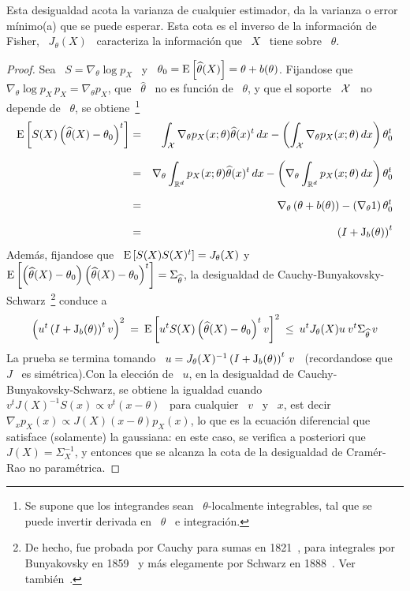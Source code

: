 %
\noindent Esta desigualdad  acota la varianza de cualquier  estimador, \ie da la
varianza o error m\'inimo(a) que se puede esperar. Esta cota es el inverso de la
informaci\'on de Fisher, \ie \  $J_\theta(X)$ \ caracteriza la informaci\'on que
\ $X$ \ tiene sobre \ $\theta$.
%
\begin{proof}
  Sea  \   $S  =  \nabla_\theta  \log   p_X$  \  y  \   $\theta_0  =  \operatorname{E}\left[
    \widehat{\theta}(X)  \right]   =  \theta  +  b(\theta)$.   Fijandose  que  \
  $\nabla_\theta \log p_X \, p_X  = \nabla_\theta p_X$, que \ $\widehat{\theta}$
  \ no  es funci\'on de \ $\theta$,  y que el soporte  \ $\mathcal{X}$ \ no  depende de \
  $\theta$,  se   obtiene~\footnote{Se  supone   que  los  integrandes   sean  \
    $\theta$-localmente  integrables, tal que  se puede  invertir derivada  en \
    $\theta$ \ e integraci\'on.}
  \begin{eqnarray*}
  \operatorname{E}\left[ S(X) \left( \widehat{\theta}(X) - \theta_0 \right)^t \right] & = &
  \int_{\mathcal{X}} \nabla_\theta p_X(x;\theta) \widehat{\theta}(x)^t \, dx - \left(
  \int_{\mathcal{X}} \nabla_\theta p_X(x;\theta) \, dx \right) \theta_0^t\\[2.5mm]
  & = & \nabla_\theta \int_{\mathbb{R}^d} p_X(x;\theta) \widehat{\theta}(x)^t \, dx -
  \left( \nabla_\theta \int_{\mathbb{R}^d} p_X(x;\theta) \, dx \right)
  \theta_0^t\\[2.5mm]
  & = & \nabla_\theta \left( \theta + b(\theta) \right)  - 
  \left( \nabla_\theta 1 \right) \theta_0^t\\[2.5mm]
  & = & \left( I + \operatorname{J}_b(\theta) \right)^t
  \end{eqnarray*}
  Adem\'as, fijandose  que \  $\operatorname{E}\left[ S(X) S(X)^t  \right] =  J_\theta(X)$ y
  $\operatorname{E}\left[   \left(    \widehat{\theta}(X)   -   \theta_0    \right)   \left(
      \widehat{\theta}(X)      -      \theta_0      \right)^t     \right]      =
  \Sigma_{\widehat{\theta}}$,            la            desigualdad            de
  Cauchy-Bunyakovsky-Schwarz~\footnote{De  hecho, fue  probada  por Cauchy  para
    sumas   en   1821~\cite{Cau21},   para   integrales   por   Bunyakovsky   en
    1859~\cite{Bou59} y  m\'as elegamente por Schwarz  en 1888~\cite{Sch88}. Ver
    tambi\'en~\cite{Ste04}.}  conduce a
  \[
  \left( u^t \left( I + \operatorname{J}_b(\theta)  \right)^t v \right)^2 \: = \: \operatorname{E}\left[
    u^t S(X) \left( \widehat{\theta}(X) -  \theta_0 \right)^t v \right]^2 \: \le
  \: u^t J_\theta(X) u \: v^t \Sigma_{\widehat{\theta}} \, v
  \]
  La prueba se termina tomando \ $u = J_\theta(X)^{-1} \left( I + \operatorname{J}_b(\theta)
  \right)^t \,  v$ \ (recordandose que  \ $J$ \ es  sim\'etrica).\newline Con la
  elecci\'on  de \  $u$,  en la  desigualdad  de Cauchy-Bunyakovsky-Schwarz,  se
  obtiene la igualdad  cuando \ $v^t J(X)^{-1} S(x) \propto v^t  (x - \theta)$ \
  para cualquier \ $v$ \ y \ $x$,  est decir \ $\nabla_x p_X (x) \propto J(X) (x
  -  \theta)  p_X(x)$,  lo  que  es  la  ecuaci\'on  diferencial  que  satisface
  (solamente) la gaussiana: en este caso, se verifica a posteriori que \ $J(X) =
  \Sigma_X^{-1}$,  y  entonces que  se  alcanza la  cota  de  la desigualdad  de
  Cram\'er-Rao no param\'etrica.
\end{proof}
